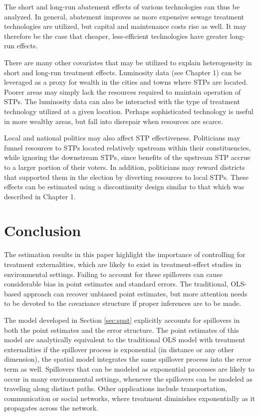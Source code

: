 \documentclass[12pt]{article}
\begin{document}
The short and long-run abatement effects of various technologies can thus be analyzed. In general, abatement improves as more expensive sewage treatment technologies are utilized, but capital and maintenance costs rise as well. It may therefore be the case that cheaper, less-efficient technologies have greater long-run effects.

There are many other covariates that may be utilized to explain heterogeneity in short and long-run treatment effects. Luminosity data (see Chapter 1) can be leveraged as a proxy for wealth in the cities and towns where STPs are located. Poorer areas may simply lack the resources required to maintain operation of STPs. The luminosity data can also be interacted with the type of treatment technology utilized at a given location. Perhaps sophisticated technology is useful in more wealthy areas, but fall into disrepair when resources are scarce. 

Local and national politics may also affect STP effectiveness. Politicians may funnel resources to STPs located relatively upstream within their constituencies, while ignoring the downstream STPs, since benefits of the upstream STP accrue to a larger portion of their voters. In addition, politicians may reward districts that supported them in the election by diverting resources to local STPs. These effects can be estimated using a discontinuity design similar to that which was described in Chapter 1. 

\section{Conclusion}
\label{sec:conclusion}


The estimation results in this paper highlight the importance of controlling for treatment externalities, which are likely to exist in treatment-effect studies in environmental settings. Failing to account for these spillovers can cause considerable bias in point estimates and standard errors. The traditional, OLS-based approach can recover unbiased point estimates, but more attention needs to be devoted to the covariance structure if proper inferences are to be made. 

The model developed in Section \ref{sec:spat} explicitly accounts for spillovers in both the point estimates and the error structure. The point estimates of this model are analytically equivalent to the traditional OLS model with treatment externalities if the spillover process is exponential (in distance or any other dimension), the spatial model integrates the same spillover process into the error term as well. Spillovers that can be modeled as exponential processes are likely to occur in many environmental settings, whenever the spillovers can be modeled as traveling along distinct paths. Other applications include transportation, communication or social networks, where treatment diminishes exponentially as it propagates across the network. 
\end{document}
